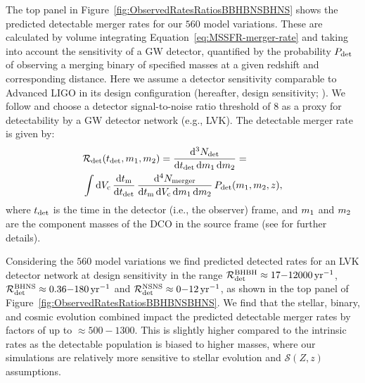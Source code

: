 \documentclass[fleqn,usenatbib]{mnras}
\newcommand\rate{\mathcal{R}}
\newcommand{\yearmin}{\ensuremath{\,\rm{yr}^{-1}}\xspace}
\newcommand{\SFRD}{\ensuremath{\mathcal{S}(Z,z)}\xspace}
\newcommand{\tmerger}{\ensuremath{{t}_{\rm{m}}}\xspace}
\newcommand{\tdet}{\ensuremath{{t}_{\rm{det}}}\xspace}
\newcommand{\Ndet}{\ensuremath{{N}_{\rm{det}}}\xspace}
\newcommand{\Nmerger}{\ensuremath{{N}_{\rm{merger}}}\xspace}
\newcommand{\Pdet}{\ensuremath{{P}_{\rm{det}}}\xspace}
\newcommand{\Vc}{\ensuremath{{V}_{\rm{c}}}\xspace}
\newcommand*\diff{\mathop{}\!\mathrm{d}}
\newcommand{\Nmodels}{\ensuremath{560}\xspace}
\newcommand{\RateObservedAzeroBHBHmax}{\ensuremath{12000}\xspace}
\newcommand{\RateObservedAzeroBHBHmin}{\ensuremath{17}\xspace}
\newcommand{\RateObservedAzeroBHNSmax}{\ensuremath{180}\xspace}
\newcommand{\RateObservedAzeroBHNSmin}{\ensuremath{0.36}\xspace}
\newcommand{\RateObservedAzeroNSNSmax}{\ensuremath{12}\xspace}
\newcommand{\RateObservedAzeroNSNSmin}{\ensuremath{0}\xspace}
\begin{document}
The top panel in Figure~\ref{fig:ObservedRatesRatiosBBHBNSBHNS} shows the predicted detectable merger rates for our \Nmodels model variations.  These are calculated by volume integrating Equation~\ref{eq:MSSFR-merger-rate} and taking into account the sensitivity of a \ac{GW} detector, quantified by the probability \Pdet of observing a merging binary of specified masses at a given redshift and corresponding distance. Here we assume a detector sensitivity comparable to Advanced LIGO in its design configuration (hereafter, design sensitivity; \citealt{2015CQGra..32g4001L,2020LRR....21....3A}).  
We follow \citet{2018MNRAS.477.4685B} and choose a detector signal-to-noise ratio threshold of 8 as a proxy for detectability by a \ac{GW} detector network (e.g., LVK). The detectable merger rate is given by: 
\begin{align}
\label{eq:rate_detector}
%
	&\rate_{\rm{det}}(\tdet, m_{\rm{1}}, m_{\rm{2}}) = 
	\frac{\diff^3 \Ndet}{\diff \tdet  \diff m_{\rm{1}} \diff m_{\rm{2}}} =
	\notag  \\
%
	&\int 
	\diff \Vc  \,
	 \frac{\diff \tmerger}{\diff \tdet}  \,  
	  \frac{\diff^4 \Nmerger }{\diff \tmerger \diff \Vc   \diff m_{\rm{1}} \diff m_{\rm{2}}} \,
	  \Pdet (m_{\rm{1}}, m_{\rm{2}}, z),
%
\end{align}
%
where \tdet is the time in the detector (i.e., the observer) frame, and $m_{\rm{1}}$ and $m_{\rm{2}}$ are the component masses of the \ac{DCO} in the source frame (see   for further details).  

Considering the \Nmodels model variations we find predicted detected rates for an LVK detector network at design sensitivity in the range $\rate_{\rm{det}}^{\rm{BHBH}} \approx  \RateObservedAzeroBHBHmin{-}\RateObservedAzeroBHBHmax\yearmin$, $\rate_{\rm{det}}^{\rm{BHNS}}\approx  \RateObservedAzeroBHNSmin{-}\RateObservedAzeroBHNSmax  \yearmin$ and $\rate_{\rm{det}}^{\rm{NSNS}}\approx \RateObservedAzeroNSNSmin{-}\RateObservedAzeroNSNSmax  \yearmin$, as shown in the top panel of Figure~\ref{fig:ObservedRatesRatiosBBHBNSBHNS}. We find that the stellar, binary, and cosmic evolution combined impact the predicted detectable merger rates by factors of up to $\approx 500{-}1300$. This is slightly higher compared to the intrinsic rates as the detectable population is biased to higher masses, where our simulations are relatively more sensitive to stellar evolution and \SFRD assumptions. 
\end{document}
